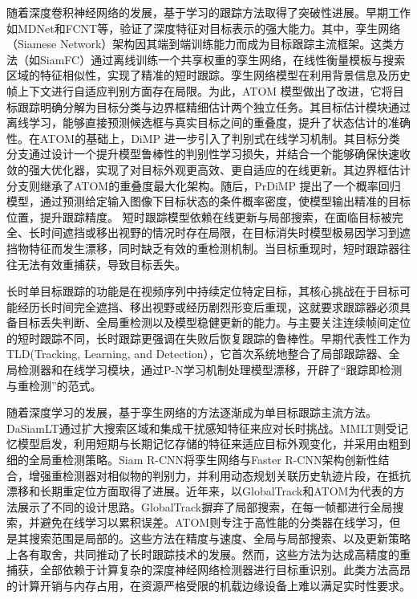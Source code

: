 随着深度卷积神经网络的发展，基于学习的跟踪方法取得了突破性进展。早期工作如MDNet\cite{Nam2016MDNet}和FCNT\cite{Wang2015FCNT}等，验证了深度特征对目标表示的强大能力。其中，孪生网络（Siamese Network）架构因其端到端训练能力而成为目标跟踪主流框架。这类方法（如SiamFC\cite{Bertinetto2016SiamFC}）通过离线训练一个共享权重的孪生网络，在线性衡量模板与搜索区域的特征相似性，实现了精准的短时跟踪。孪生网络模型在利用背景信息及历史帧上下文进行自适应判别方面存在局限。为此，ATOM\cite{Danelljan2019ATOM} 模型做出了改进，它将目标跟踪明确分解为目标分类与边界框精细估计两个独立任务。其目标估计模块通过离线学习，能够直接预测候选框与真实目标之间的重叠度，提升了状态估计的准确性。在ATOM的基础上，DiMP\cite{Bhat2019DiMP} 进一步引入了判别式在线学习机制。其目标分类分支通过设计一个提升模型鲁棒性的判别性学习损失，并结合一个能够确保快速收敛的强大优化器，实现了对目标外观更高效、更自适应的在线更新。其边界框估计分支则继承了ATOM的重叠度最大化架构。随后，PrDiMP\cite{Danelljan2020PrDiMP} 提出了一个概率回归模型，通过预测给定输入图像下目标状态的条件概率密度，使模型输出精准的目标位置，提升跟踪精度。
短时跟踪模型依赖在线更新与局部搜索，在面临目标被完全、长时间遮挡或移出视野的情况时存在局限，在目标消失时模型极易因学习到遮挡物特征而发生漂移，同时缺乏有效的重检测机制。当目标重现时，短时跟踪器往往无法有效重捕获，导致目标丢失。

长时单目标跟踪的功能是在视频序列中持续定位特定目标，其核心挑战在于目标可能经历长时间完全遮挡、移出视野或经历剧烈形变后重现，这就要求跟踪器必须具备目标丢失判断、全局重检测以及模型稳健更新的能力。与主要关注连续帧间定位的短时跟踪不同，长时跟踪更强调在失败后恢复跟踪的鲁棒性。早期代表性工作为TLD\cite{Kalal2012TLD}(Tracking, Learning, and Detection），它首次系统地整合了局部跟踪器、全局检测器和在线学习模块，通过P-N学习机制处理模型漂移，开辟了“跟踪即检测与重检测”的范式。

随着深度学习的发展，基于孪生网络的方法逐渐成为单目标跟踪主流方法。DaSiamLT\cite{Zhu2018DaSiamLT}通过扩大搜索区域和集成干扰感知特征来应对长时挑战。MMLT\cite{Lee2019MMLT}则受记忆模型启发，利用短期与长期记忆存储的特征来适应目标外观变化，并采用由粗到细的全局重检测策略。Siam R-CNN\cite{Voigtlaender2020SiamRCNN}将孪生网络与Faster R-CNN架构创新性结合，增强重检测器对相似物的判别力，并利用动态规划关联历史轨迹片段，在抵抗漂移和长期重定位方面取得了进展。近年来，以GlobalTrack\cite{Huang_Zhao_Huang_2020}和ATOM\cite{Danelljan2019ATOM}为代表的方法展示了不同的设计思路。GlobalTrack摒弃了局部搜索，在每一帧都进行全局搜索，并避免在线学习以累积误差。ATOM则专注于高性能的分类器在线学习，但是其搜索范围是局部的。这些方法在精度与速度、全局与局部搜索、以及更新策略上各有取舍，共同推动了长时跟踪技术的发展。然而，这些方法为达成高精度的重捕获，全部依赖于计算复杂的深度神经网络检测器进行目标重识别。此类方法高昂的计算开销与内存占用，在资源严格受限的机载边缘设备上难以满足实时性要求。

